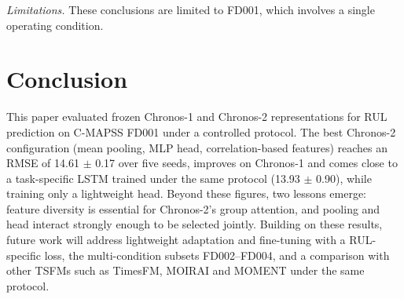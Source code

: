 \documentclass{svproc}
\begin{document}
\textit{Limitations.} These conclusions are limited to FD001, which
involves a single operating condition.

\section{Conclusion}

This paper evaluated frozen Chronos-1 and Chronos-2 representations for
RUL prediction on C-MAPSS FD001 under a controlled protocol. The best
Chronos-2 configuration (mean pooling, MLP head, correlation-based
features) reaches an RMSE of 14.61 $\pm$ 0.17 over five seeds, improves
on Chronos-1 and comes close to a task-specific LSTM trained under the
same protocol (13.93 $\pm$ 0.90), while training only a lightweight head. Beyond
these figures, two lessons emerge: feature diversity is essential for
Chronos-2's group attention, and pooling and head interact strongly
enough to be selected jointly. Building on these results, future work
will address lightweight adaptation and fine-tuning with a RUL-specific loss, the multi-condition
subsets FD002--FD004, and a comparison with other TSFMs such as TimesFM,
MOIRAI and MOMENT under the same protocol.



\end{document}
